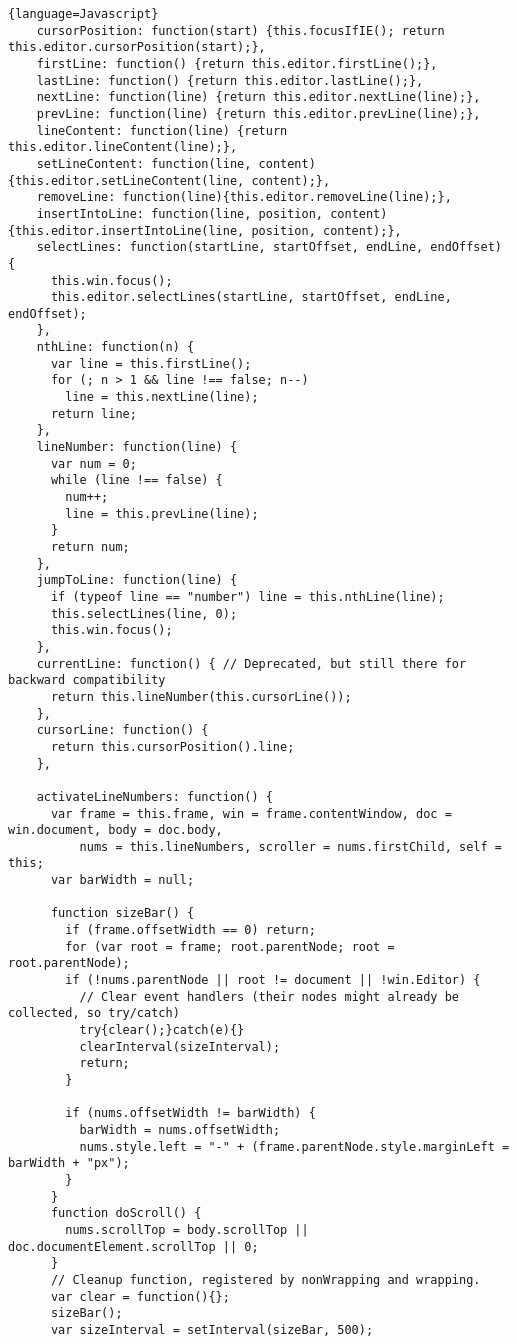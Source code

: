 \begin{lstlisting}{language=Javascript}
    cursorPosition: function(start) {this.focusIfIE(); return this.editor.cursorPosition(start);},
    firstLine: function() {return this.editor.firstLine();},
    lastLine: function() {return this.editor.lastLine();},
    nextLine: function(line) {return this.editor.nextLine(line);},
    prevLine: function(line) {return this.editor.prevLine(line);},
    lineContent: function(line) {return this.editor.lineContent(line);},
    setLineContent: function(line, content) {this.editor.setLineContent(line, content);},
    removeLine: function(line){this.editor.removeLine(line);},
    insertIntoLine: function(line, position, content) {this.editor.insertIntoLine(line, position, content);},
    selectLines: function(startLine, startOffset, endLine, endOffset) {
      this.win.focus();
      this.editor.selectLines(startLine, startOffset, endLine, endOffset);
    },
    nthLine: function(n) {
      var line = this.firstLine();
      for (; n > 1 && line !== false; n--)
        line = this.nextLine(line);
      return line;
    },
    lineNumber: function(line) {
      var num = 0;
      while (line !== false) {
        num++;
        line = this.prevLine(line);
      }
      return num;
    },
    jumpToLine: function(line) {
      if (typeof line == "number") line = this.nthLine(line);
      this.selectLines(line, 0);
      this.win.focus();
    },
    currentLine: function() { // Deprecated, but still there for backward compatibility
      return this.lineNumber(this.cursorLine());
    },
    cursorLine: function() {
      return this.cursorPosition().line;
    },

    activateLineNumbers: function() {
      var frame = this.frame, win = frame.contentWindow, doc = win.document, body = doc.body,
          nums = this.lineNumbers, scroller = nums.firstChild, self = this;
      var barWidth = null;

      function sizeBar() {
        if (frame.offsetWidth == 0) return;
        for (var root = frame; root.parentNode; root = root.parentNode);
        if (!nums.parentNode || root != document || !win.Editor) {
          // Clear event handlers (their nodes might already be collected, so try/catch)
          try{clear();}catch(e){}
          clearInterval(sizeInterval);
          return;
        }

        if (nums.offsetWidth != barWidth) {
          barWidth = nums.offsetWidth;
          nums.style.left = "-" + (frame.parentNode.style.marginLeft = barWidth + "px");
        }
      }
      function doScroll() {
        nums.scrollTop = body.scrollTop || doc.documentElement.scrollTop || 0;
      }
      // Cleanup function, registered by nonWrapping and wrapping.
      var clear = function(){};
      sizeBar();
      var sizeInterval = setInterval(sizeBar, 500);


\end{lstlisting}
